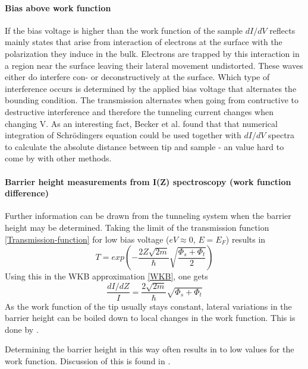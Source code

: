 \paragraph{Bias above work function}
If the bias voltage is higher than the work function of the sample $dI/dV$ reflects mainly states that arise from interaction of electrons at the surface with the polarization they induce in the bulk. Electrons are trapped by this interaction in a region near the surface leaving their lateral movement undistorted. These waves either do interfere con- or deconstructively at the surface. Which type of interference occurs is determined by the applied bias voltage that alternates the bounding condition. The transmission alternates when going from contructive to destructive interference and therefore the tunneling current changes when changing V. 
As an interesting fact, Becker et al.\cite{becker_electron_1985} found that that numerical integration of Schr\"odingers equation could be used together with $dI/dV$ spectra to calculate the absolute distance between tip and sample - an value hard to come by with other methods.

\paragraph{Barrier height measurements from I(Z) spectroscopy (work function difference)}
Further information can be drawn from the tunneling system when the barrier height may be determined.
Taking the limit of the transmission function \eqref{Transmission-function} for low bias voltage ($eV\approx0$, $E=E_F$) results in 
$$T=exp\left(-\frac{2Z\sqrt{2m}}{\hbar}\sqrt{\frac{\Phi_s+\Phi_t}{2}}\right)$$
Using this in the WKB approximation \eqref{WKB}, one gets $$\frac{dI/dZ}{I}=\frac{2\sqrt{2m}}{\hbar}\sqrt{\Phi_s+\Phi_t}$$
As the work function of the tip usually stays constant, lateral variations in the barrier height can be boiled down to local changes in the work function. This is done by \cite{jia_variation_1998}.

Determining the barrier height in this way often results in to low values for the work function. Discussion of this is found in \cite[96]{bonnell_scanning_1993}.


